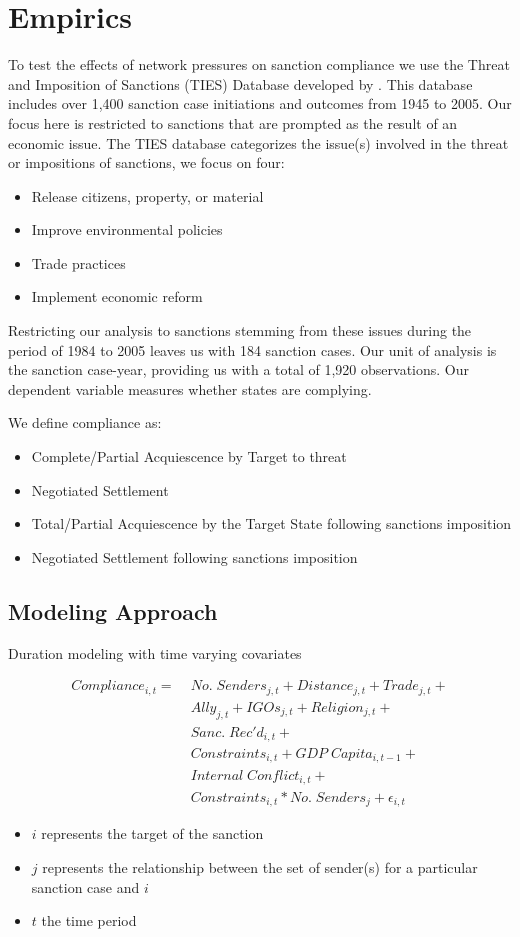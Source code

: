 \section{Empirics}
\label{empirics}

To test the effects of network pressures on sanction compliance we use the Threat and Imposition of Sanctions (TIES) Database developed by \citet{morgan2009threat}. This database includes over 1,400 sanction case initiations and outcomes from 1945 to 2005. Our focus here is restricted to sanctions that are prompted as the result of an economic issue. The TIES database categorizes the issue(s) involved in the threat or impositions of sanctions, we focus on four:

\begin{itemize}
	\item Release citizens, property, or material
	\item Improve environmental policies
	\item Trade practices
	\item Implement economic reform
\end{itemize}

Restricting our analysis to sanctions stemming from these issues during the period of 1984 to 2005 leaves us with 184 sanction cases. Our unit of analysis is the sanction case-year, providing us with a total of 1,920 observations. Our dependent variable measures whether states are complying. 


We define compliance as:
	\begin{itemize}
		\item Complete/Partial Acquiescence by Target to threat
		\item Negotiated Settlement
		\item Total/Partial Acquiescence by the Target State following sanctions imposition
		\item Negotiated Settlement following sanctions imposition
	\end{itemize}
	
\subsection{Modeling Approach} 

Duration modeling with time varying covariates

\begin{align*}
		Compliance_{i,t} =\; & No. \; Senders_{j,t} + Distance_{j,t} + Trade_{j,t}  + \\
		 &Ally_{j,t} + IGOs_{j,t} + Religion_{j,t} +\\
 		 &Sanc. \; Rec'd_{i,t} + \\
		 &Constraints_{i,t} + GDP \; Capita_{i,t-1} +\\
		 & Internal \; Conflict_{i,t} +\\
		 &Constraints_{i,t}*No. \; Senders_{j} + \epsilon_{i,t}
	\end{align*}
	
\begin{itemize}
	\item $i$ represents the target of the sanction
	\item $j$ represents the relationship between the set of sender(s) for a particular sanction case and $i$
	\item $t$ the time period
\end{itemize}
